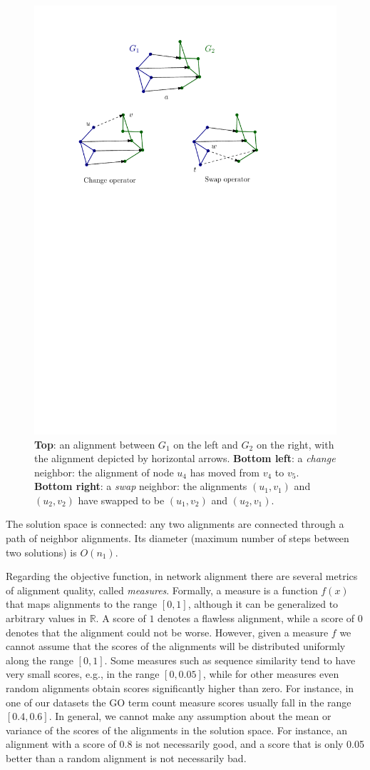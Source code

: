 \documentclass[]{article}
\begin{document}
\begin{figure}
\centering
\includegraphics[width=0.7\linewidth]{../figures/operators3}
\caption{{\bf Top}: an alignment between $G_1$ on the left and $G_2$ on the right, with the alignment depicted by horizontal arrows.
{\bf Bottom left}: a {\it change} neighbor: the alignment of node $u_4$ has moved from $v_4$ to $v_5$.
{\bf Bottom right}: a {\it swap} neighbor: the alignments $(u_1,v_1)$ and $(u_2,v_2)$ have swapped to be $(u_1,v_2)$ and $(u_2,v_1)$.}
\label{fig:operators}
\end{figure}

The solution space is connected: any two alignments are connected through a path of neighbor alignments. Its diameter (maximum number of steps between two solutions) is $O(n_1)$.

Regarding the objective function, in network alignment there are several metrics of alignment quality, called \textit{measures}. Formally, a measure is a function $f(x)$ that maps alignments to the range $[0,1]$, although it can be generalized to arbitrary values in $\mathbb{R}$. A score of $1$ denotes a flawless alignment, while a score of $0$ denotes that the alignment could not be worse. However, given a measure $f$ we cannot assume that the scores of the alignments will be distributed uniformly along the range $[0,1]$. Some measures such as sequence similarity tend to have very small scores, e.g., in the range $[0,0.05]$, while for other measures even random alignments obtain scores significantly higher than zero. For instance, in one of our datasets the GO term count measure scores usually fall in the range $[0.4,0.6]$. In general, we cannot make any assumption about the mean or variance of the scores of the alignments in the solution space. For instance, an alignment with a score of 0.8 is not necessarily good, and a score that is only 0.05 better than a random alignment is not necessarily bad.
\end{document}
